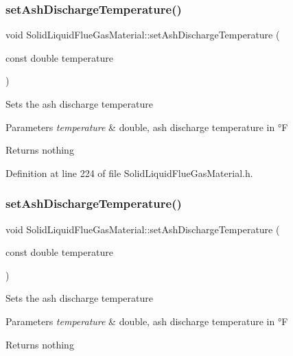 \subsubsection{\texorpdfstring{set\+Ash\+Discharge\+Temperature()}{setAshDischargeTemperature()}\hspace{0.1cm}{\footnotesize\ttfamily [1/3]}}
{\footnotesize\ttfamily void Solid\+Liquid\+Flue\+Gas\+Material\+::set\+Ash\+Discharge\+Temperature (\begin{DoxyParamCaption}\item[{const double}]{temperature }\end{DoxyParamCaption})\hspace{0.3cm}{\ttfamily [inline]}}

Sets the ash discharge temperature 
\begin{DoxyParams}{Parameters}
{\em temperature} & double, ash discharge temperature in °F \\
\hline
\end{DoxyParams}
\begin{DoxyReturn}{Returns}
nothing 
\end{DoxyReturn}


Definition at line 224 of file Solid\+Liquid\+Flue\+Gas\+Material.\+h.

\mbox{\label{class_solid_liquid_flue_gas_material_ad29543a88737c3d051c7d824287bc791}} 
\subsubsection{\texorpdfstring{set\+Ash\+Discharge\+Temperature()}{setAshDischargeTemperature()}\hspace{0.1cm}{\footnotesize\ttfamily [2/3]}}
{\footnotesize\ttfamily void Solid\+Liquid\+Flue\+Gas\+Material\+::set\+Ash\+Discharge\+Temperature (\begin{DoxyParamCaption}\item[{const double}]{temperature }\end{DoxyParamCaption})\hspace{0.3cm}{\ttfamily [inline]}}

Sets the ash discharge temperature 
\begin{DoxyParams}{Parameters}
{\em temperature} & double, ash discharge temperature in °F \\
\hline
\end{DoxyParams}
\begin{DoxyReturn}{Returns}
nothing 
\end{DoxyReturn}


